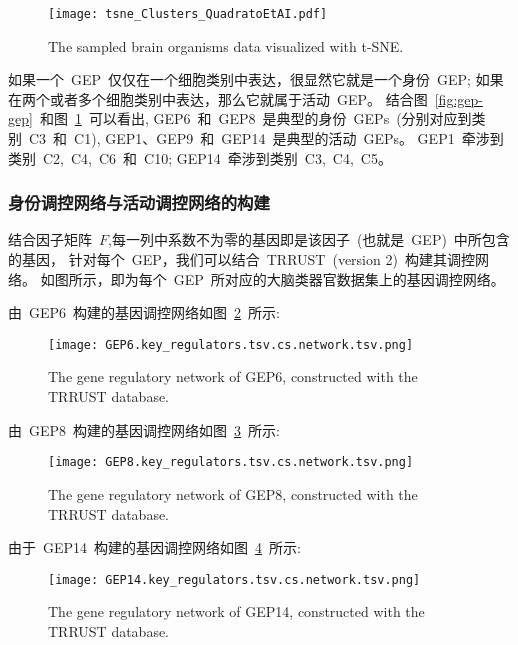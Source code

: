\begin{figure}[!htbp]
    \centering
    \texttt{[image: tsne\_Clusters\_QuadratoEtAI.pdf]}
    \caption{The sampled brain organisms data visualized with t-SNE.
    }
    \label{fig:gep-tsne}
\end{figure}

如果一个~GEP~仅仅在一个细胞类别中表达，很显然它就是一个身份~GEP;
如果在两个或者多个细胞类别中表达，那么它就属于活动~GEP。
结合图~\ref{fig:gep-gep}~和图~\ref{fig:gep-tsne}~可以看出, 
GEP6~和~GEP8~是典型的身份~GEPs~(分别对应到类别~C3~和~C1), GEP1、GEP9~和~GEP14~是典型的活动~GEPs。
GEP1~牵涉到类别~C2,~C4,~C6~和~C10; GEP14~牵涉到类别~C3,~C4,~C5。

\subsubsection{身份调控网络与活动调控网络的构建}
结合因子矩阵~$F$,每一列中系数不为零的基因即是该因子~(也就是~GEP)~中所包含的基因，
针对每个~GEP，我们可以结合~TRRUST~(version 2)~构建其调控网络。
如图所示，即为每个~GEP~所对应的大脑类器官数据集上的基因调控网络。

由~GEP6~构建的基因调控网络如图~\ref{fig:gep-grn-gep6}~所示:
\begin{figure}[!htbp]
    \centering
    \texttt{[image: GEP6.key\_regulators.tsv.cs.network.tsv.png]}
    \caption{The gene regulatory network of GEP6, constructed with the TRRUST database.}
    \label{fig:gep-grn-gep6}
\end{figure}

由~GEP8~构建的基因调控网络如图~\ref{fig:gep-grn-gep8}~所示:
\begin{figure}[!htbp]
    \centering
    \texttt{[image: GEP8.key\_regulators.tsv.cs.network.tsv.png]}
    \caption{The gene regulatory network of GEP8, constructed with the TRRUST database.}
    \label{fig:gep-grn-gep8}
\end{figure}

由于~GEP14~构建的基因调控网络如图~\ref{fig:gep-grn-gep14}~所示:
\begin{figure}[!htbp]
    \centering
    \texttt{[image: GEP14.key\_regulators.tsv.cs.network.tsv.png]}
    \caption{The gene regulatory network of GEP14, constructed with the TRRUST database.}
    \label{fig:gep-grn-gep14}
\end{figure}

